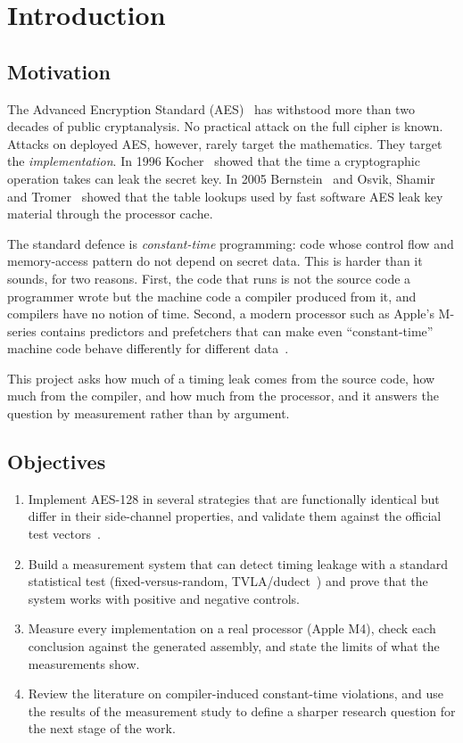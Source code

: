 \chapter{Introduction}
\label{ch:intro}

\section{Motivation}

The Advanced Encryption Standard (AES)~\cite{fips197} has withstood more than two decades of public cryptanalysis. No practical attack on the full cipher is known. Attacks on deployed AES, however, rarely target the mathematics. They target the \emph{implementation}. In 1996 Kocher~\cite{kocher96} showed that the time a cryptographic operation takes can leak the secret key. In 2005 Bernstein~\cite{bernstein05} and Osvik, Shamir and Tromer~\cite{osvik06} showed that the table lookups used by fast software AES leak key material through the processor cache.

The standard defence is \emph{constant-time} programming: code whose control flow and memory-access pattern do not depend on secret data. This is harder than it sounds, for two reasons. First, the code that runs is not the source code a programmer wrote but the machine code a compiler produced from it, and compilers have no notion of time. Second, a modern processor such as Apple's M-series contains predictors and prefetchers that can make even ``constant-time'' machine code behave differently for different data~\cite{gofetch,flop,slap}.

This project asks how much of a timing leak comes from the source code, how much from the compiler, and how much from the processor, and it answers the question by measurement rather than by argument.

\section{Objectives}

\begin{enumerate}
  \item Implement AES-128 in several strategies that are functionally identical but differ in their side-channel properties, and validate them against the official test vectors~\cite{fips197,sp80038a}.
  \item Build a measurement system that can detect timing leakage with a standard statistical test (fixed-versus-random, TVLA/dudect~\cite{tvla,dudect}) and prove that the system works with positive and negative controls.
  \item Measure every implementation on a real processor (Apple M4), check each conclusion against the generated assembly, and state the limits of what the measurements show.
  \item Review the literature on compiler-induced constant-time violations, and use the results of the measurement study to define a sharper research question for the next stage of the work.
\end{enumerate}

